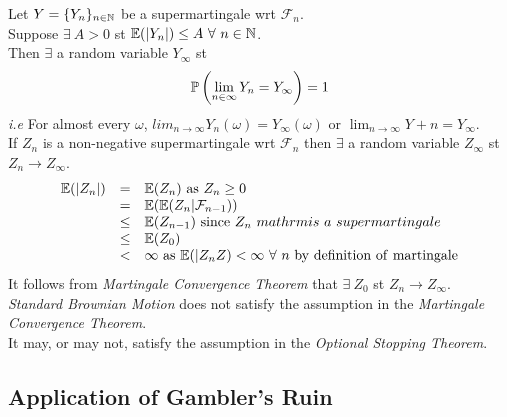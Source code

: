 \documentclass[11pt,a4paper]{article}
\begin{document}
Let $Y=\{Y_n\}_{n\in\mathbb{N}}$ be a supermartingale wrt $\mathcal{F}_n$.\\
Suppose $\exists\ A>0$ st $\expect(|Y_n|)\leq A\ \forall\ n\in\nats$.\\
Then $\exists$ a random variable $Y_\infty$ st
$$\mathbb{P}\left(\lim_{n\in\infty}Y_n=Y_\infty\right)=1$$
\textit{i.e} For almost every $\omega$, $lim_{n\to\infty}Y_n(\omega)=Y_\infty(\omega)$ or $\lim_{n\to\infty}Y+n=Y_\infty$.\\

If $Z_n$ is a non-negative supermartingale wrt $\mathcal{F}_n$ then $\exists$ a random variable $Z_\infty$ st $Z_n\to Z_\infty$.\\

\[\begin{array}{rcl}
\expect(|Z_n|)&=&\expect(Z_n)\ \mathrm{as}\ Z_n\geq0\\
&=&\expect(\expect(Z_n|\mathcal{F}_{n-1}))\\
&\leq&\expect(Z_{n-1})\ \mathrm{since}\ Z_n\ mathrm{is\ a\ supermartingale}\\
&\leq&\expect(Z_0)\\
&<&\infty\ \mathrm{as}\ \expect(|Z_nZ)<\infty\ \forall\ n\ \mathrm{by\ definition\ of\ martingale}
\end{array}\]
It follows from \textit{Martingale Convergence Theorem} that $\exists\ Z_0$ st $Z_n\to Z_\infty$.\\

\remark{}
\textit{Standard Brownian Motion} does not satisfy the assumption in the \textit{Martingale Convergence Theorem}.\\
It may, or may not, satisfy the assumption in the \textit{Optional Stopping Theorem}.

\subsection{Application of Gambler's Ruin}
\end{document}

